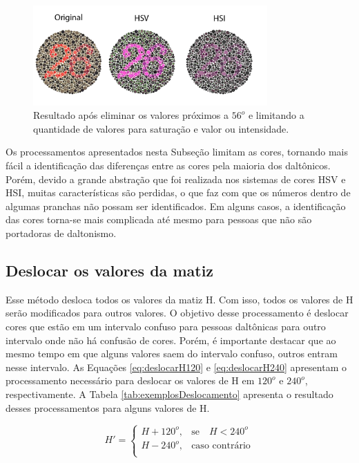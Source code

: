 \documentclass[	12pt, Times, openright, twoside, a4paper, english, brazil]{abntex2}
\begin{document}
\begin{figure}[!htb]
\centering \includegraphics[width=0.8\textwidth]{figuraHistograma3.png}
\caption{Resultado após eliminar os valores próximos a $56^o$ e limitando a quantidade de valores para saturação e valor ou intensidade.} \label{fig:figuraHistogramaHSV3}
\end{figure}

Os processamentos apresentados nesta Subseção limitam as cores, tornando mais fácil a identificação das diferenças entre as cores pela maioria dos daltônicos. Porém, devido a grande abstração que foi realizada nos sistemas de cores HSV e HSI, muitas características são perdidas, o que faz com que os números dentro de algumas pranchas não possam ser identificados. Em alguns casos, a identificação das cores torna-se mais complicada até mesmo para pessoas que não são portadoras de daltonismo.

\subsection{Deslocar os valores da matiz}
\label{subsec:deslocarMatiz}

Esse método desloca todos os valores da matiz H. Com isso, todos os valores de H serão modificados para outros valores. O objetivo desse processamento é deslocar cores que estão em um intervalo confuso para pessoas daltônicas para outro intervalo onde não há confusão de cores. Porém, é importante destacar que ao mesmo tempo em que alguns valores saem do intervalo confuso, outros entram nesse intervalo. As Equações \ref{eq:deslocarH120} e \ref{eq:deslocarH240} apresentam o processamento necessário para deslocar os valores de H em $120^o$ e $240^o$, respectivamente. A Tabela \ref{tab:exemplosDeslocamento} apresenta o resultado desses processamentos para alguns valores de H.

\begin{equation}
\label{eq:deslocarH120}
H'=\left\{
\begin{array}{rl}
       H + 120^o,   &\mbox{se}\quad  H < 240^o \\
       H - 240^o,   &\mbox{caso contrário} \\
\end{array}\right.
\end{equation}
\end{document}
